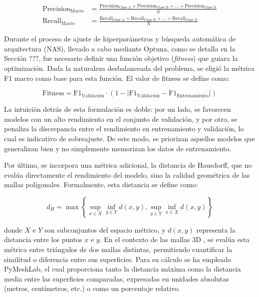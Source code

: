 \begin{align}
    \text{Precision}_{\text{Macro}} &= \frac{\text{Precision}_{\text{Clase A}}+\text{Precision}_{\text{Clase B}}+\dots+\text{Precision}_{\text{Clase N}}}{N} \\
    \text{Recall}_{\text{Macro}} &= \frac{\text{Recall}_{\text{Clase A}}+\text{Recall}_{\text{Clase B}}+\dots+\text{Recall}_{\text{Clase N}}}{N}
\end{align}

Durante el proceso de ajuste de hiperparámetros y búsqueda automática de arquitectura (NAS), llevado a cabo mediante Optuna, como se detalla en la Sección ???, fue necesario definir una función objetivo (\textit{fitness}) que guiara la optimización. Dada la naturaleza desbalanceada del problema, se eligió la métrica F1 macro como base para esta función. El valor de fitness se define como:

\begin{equation}
    \text{Fitness} = \text{F1}_{\text{Validación}} \cdot (1 - | \text{F1}_{\text{Validación}} -  \text{F1}_{\text{Entrenamiento}}|)
\end{equation}

La intuición detrás de esta formulación es doble: por un lado, se favorecen modelos con un alto rendimiento en el conjunto de validación, y por otro, se penaliza la discrepancia entre el rendimiento en entrenamiento y validación, lo cual es indicativo de sobreajuste. De este modo, se priorizan aquellos modelos que generalizan bien y no simplemente memorizan los datos de entrenamiento.

Por último, se incorpora una métrica adicional, la distancia de Hausdorff, que no evalúa directamente el rendimiento del modelo, sino la calidad geométrica de las mallas poligonales. Formalmente, esta distancia se define como:

\begin{equation}
d_H = \max\left\{\sup_{x\in X} \inf_{y \in Y} d(x,y), \sup_{y\in Y} \inf_{x \in X} d(x,y) \right\}
\end{equation}

donde $X$ e $Y$ son subconjuntos del espacio métrico, y $d(x,y)$ representa la distancia entre los puntos $x$ e $y$. En el contexto de las mallas 3D \cite{cignoni1998metro}, se evalúa esta métrica entre triángulos de dos mallas distintas, permitiendo cuantificar la similitud o diferencia entre sus superficies. Para su cálculo se ha empleado PyMeshLab, el cual proporciona tanto la distancia máxima como la distancia media entre las superficies comparadas, expresadas en unidades absolutas (metros, centímetros, etc.) o como un porcentaje relativo.

